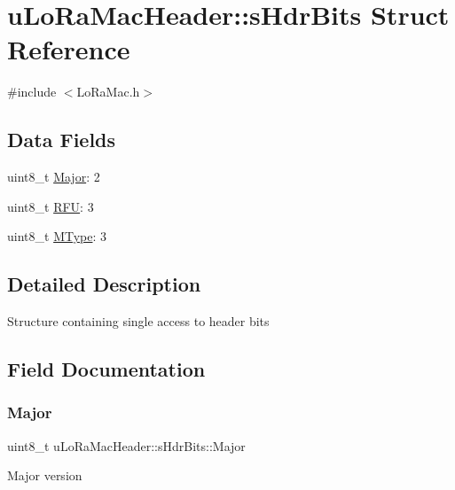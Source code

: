 \hypertarget{structuLoRaMacHeader_1_1sHdrBits}{}\section{u\+Lo\+Ra\+Mac\+Header\+:\+:s\+Hdr\+Bits Struct Reference}
\label{structuLoRaMacHeader_1_1sHdrBits}


{\ttfamily \#include $<$Lo\+Ra\+Mac.\+h$>$}

\subsection*{Data Fields}
\begin{DoxyCompactItemize}
\item 
uint8\+\_\+t \hyperlink{structuLoRaMacHeader_1_1sHdrBits_abfa1234e8fba51727315a472697b6165}{Major}\+: 2
\item 
uint8\+\_\+t \hyperlink{structuLoRaMacHeader_1_1sHdrBits_a74570244ef3b1052a532c1dfc2e83b7a}{R\+FU}\+: 3
\item 
uint8\+\_\+t \hyperlink{structuLoRaMacHeader_1_1sHdrBits_af53ac0a55b9c3458f81e9ac24b8366ae}{M\+Type}\+: 3
\end{DoxyCompactItemize}


\subsection{Detailed Description}
Structure containing single access to header bits 

\subsection{Field Documentation}
\mbox{\label{structuLoRaMacHeader_1_1sHdrBits_abfa1234e8fba51727315a472697b6165}} 
\subsubsection{\texorpdfstring{Major}{Major}}
{\footnotesize\ttfamily uint8\+\_\+t u\+Lo\+Ra\+Mac\+Header\+::s\+Hdr\+Bits\+::\+Major}

Major version \mbox{\label{structuLoRaMacHeader_1_1sHdrBits_af53ac0a55b9c3458f81e9ac24b8366ae}} 
